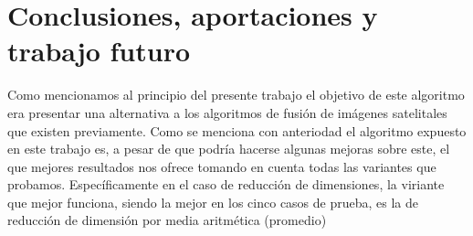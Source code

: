 \chapter*{Conclusiones, aportaciones y trabajo futuro}

Como mencionamos al principio del presente trabajo el objetivo de este algoritmo era presentar una alternativa a los algoritmos de fusión de imágenes satelitales que existen previamente. Como se menciona con anteriodad el algoritmo expuesto en este trabajo es, a pesar de que podría hacerse algunas mejoras sobre este, el que mejores resultados nos ofrece tomando en cuenta todas las variantes que probamos. Específicamente en el caso de reducción de dimensiones, la viriante que mejor funciona, siendo la mejor en los cinco casos de prueba, es la de reducción de dimensión por media aritmética (promedio) 





